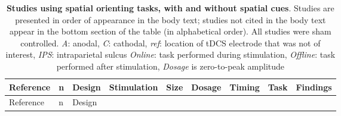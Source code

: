 \documentclass[11pt,]{memoir}
\begin{document}
\begin{longtable}[]{@{}lllllllll@{}}
\caption{\label{tab:spatial-orienting} \textbf{Studies using spatial orienting tasks, with and without spatial cues}. Studies are presented in order of appearance in the body text; studies not cited in the body text appear in the bottom section of the table (in alphabetical order). All studies were sham controlled. \emph{A}: anodal, \emph{C}: cathodal, \emph{ref}: location of tDCS electrode that was not of interest, \emph{IPS}: intraparietal sulcus \emph{Online}: task performed during stimulation, \emph{Offline}: task performed after stimulation, \emph{Dosage} is zero-to-peak amplitude}\tabularnewline
\toprule
\begin{minipage}[b]{0.12\columnwidth}\raggedright
Reference\strut
\end{minipage} & \begin{minipage}[b]{0.02\columnwidth}\raggedright
n\strut
\end{minipage} & \begin{minipage}[b]{0.04\columnwidth}\raggedright
Design\strut
\end{minipage} & \begin{minipage}[b]{0.11\columnwidth}\raggedright
Stimulation\strut
\end{minipage} & \begin{minipage}[b]{0.03\columnwidth}\raggedright
Size\strut
\end{minipage} & \begin{minipage}[b]{0.05\columnwidth}\raggedright
Dosage\strut
\end{minipage} & \begin{minipage}[b]{0.05\columnwidth}\raggedright
Timing\strut
\end{minipage} & \begin{minipage}[b]{0.11\columnwidth}\raggedright
Task\strut
\end{minipage} & \begin{minipage}[b]{0.24\columnwidth}\raggedright
Findings\strut
\end{minipage}\tabularnewline
\midrule
\endfirsthead
\toprule
\begin{minipage}[b]{0.12\columnwidth}\raggedright
Reference\strut
\end{minipage} & \begin{minipage}[b]{0.02\columnwidth}\raggedright
n\strut
\end{minipage} & \begin{minipage}[b]{0.04\columnwidth}\raggedright
Design\strut

\end{minipage}
\end{longtable}
\end{document}
